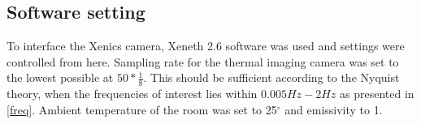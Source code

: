\subsection{Software setting}

To interface the Xenics camera, Xeneth 2.6 software was used and settings were controlled from here.   
Sampling rate for the thermal imaging camera was set to the lowest possible at $50*\frac{1}{8}$. This should be sufficient according to the Nyquist theory, when the frequencies of interest lies within $0.005 Hz-2 Hz$ as presented in \cref{freq}. Ambient temperature of the room was set to 25$^{\circ}$ and emissivity to 1. 



